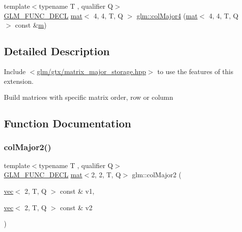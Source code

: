 \begin{DoxyCompactItemize}
\item 
{\footnotesize template$<$typename T , qualifier Q$>$ }\\\mbox{\hyperlink{setup_8hpp_ab2d052de21a70539923e9bcbf6e83a51}{G\+L\+M\+\_\+\+F\+U\+N\+C\+\_\+\+D\+E\+CL}} \mbox{\hyperlink{structglm_1_1mat}{mat}}$<$ 4, 4, T, Q $>$ \mbox{\hyperlink{group__gtx__matrix__major__storage_gaf3f9511c366c20ba2e4a64c9e4cec2b3}{glm\+::col\+Major4}} (\mbox{\hyperlink{structglm_1_1mat}{mat}}$<$ 4, 4, T, Q $>$ const \&\mbox{\hyperlink{_s_d_l__opengl__glext_8h_af593500c283bf1a787a6f947f503a5c2}{m}})
\end{DoxyCompactItemize}


\subsection{Detailed Description}
Include $<$\mbox{\hyperlink{matrix__major__storage_8hpp}{glm/gtx/matrix\+\_\+major\+\_\+storage.\+hpp}}$>$ to use the features of this extension.

Build matrices with specific matrix order, row or column 

\subsection{Function Documentation}
\mbox{\label{group__gtx__matrix__major__storage_gaaff72f11286e59a4a88ed21a347f284c}} 
\subsubsection{\texorpdfstring{col\+Major2()}{colMajor2()}\hspace{0.1cm}{\footnotesize\ttfamily [1/2]}}
{\footnotesize\ttfamily template$<$typename T , qualifier Q$>$ \\
\mbox{\hyperlink{setup_8hpp_ab2d052de21a70539923e9bcbf6e83a51}{G\+L\+M\+\_\+\+F\+U\+N\+C\+\_\+\+D\+E\+CL}} \mbox{\hyperlink{structglm_1_1mat}{mat}}$<$2, 2, T, Q$>$ glm\+::col\+Major2 (\begin{DoxyParamCaption}\item[{\mbox{\hyperlink{structglm_1_1vec}{vec}}$<$ 2, T, Q $>$ const \&}]{v1,  }\item[{\mbox{\hyperlink{structglm_1_1vec}{vec}}$<$ 2, T, Q $>$ const \&}]{v2 }\end{DoxyParamCaption})}

